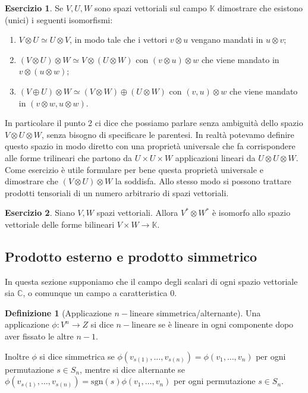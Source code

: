 \documentclass[11pt]{article}
\theoremstyle{plain}
\theoremstyle{definition}
\newtheorem{defn}{Definizione}[section]
\newtheorem{exercise}{Esercizio}[section]
\theoremstyle{remark}
\newcommand{\C}{\mathbb{C}}
\newcommand{\K}{\mathbb{K}}
\DeclareMathOperator{\iso}{\simeq}
\begin{document}
\begin{exercise}
Se $V,U,W$ sono spazi vettoriali sul campo $\K$ dimostrare che esistono (unici) i seguenti isomorfismi:
\begin{enumerate}
\item $V\otimes U \iso U\otimes V$, in modo tale che i vettori $v\otimes u$ vengano mandati in $u\otimes v$;
\item $(V\otimes U)\otimes W \iso V\otimes(U\otimes W)$ con $(v\otimes u)\otimes w$ che viene mandato in $v\otimes(u\otimes w)$;
\item $(V\oplus U)\otimes W \iso (V\otimes W) \oplus (U\otimes W)$ con $(v,u)\otimes w$ che viene mandato in $(v\otimes w, u\otimes w)$.
\end{enumerate}
\end{exercise}
In particolare il punto 2 ci dice che possiamo parlare senza ambiguità dello spazio $V\otimes U \otimes W$, senza bisogno di specificare le parentesi.
In realtà potevamo definire questo spazio in modo diretto con una proprietà universale che fa corrispondere alle forme trilineari che partono
da $U\times U\times W$ applicazioni lineari da $U\otimes U\otimes W$. Come esercizio è utile formulare per bene questa proprietà universale 
e dimostrare che $(V\otimes U)\otimes W$ la soddisfa. Allo stesso modo si possono trattare prodotti tensoriali di un numero arbitrario di spazi vettoriali.
\begin{exercise}
Siano $V,W$ spazi vettoriali. Allora $V^*\otimes W^*$ è isomorfo allo spazio vettoriale delle forme bilineari $V\times W\to \K$.
\end{exercise}


\subsection{Prodotto esterno e prodotto simmetrico}
In questa sezione supponiamo che il campo degli scalari di ogni spazio vettoriale sia $\C$, o comunque un campo a caratteristica $0$.


\begin{defn}[Applicazione $n-$lineare simmetrica/alternante]
 Una applicazione $\phi: V^n \to Z$ si dice $n-$lineare se è lineare in ogni componente dopo aver fissato le altre $n-1$.

 Inoltre $\phi$ si dice simmetrica se $\phi(v_{s(1)},\ldots,v_{s(n)})=\phi(v_1,\ldots,v_n)$ per ogni permutazione $s \in S_n$, mentre si dice
 alternante se $\phi(v_{s(1)},\ldots,v_{s(n)})=\mathrm{sgn}(s)\phi(v_1,\ldots,v_n)$ per ogni permutazione $s \in S_n$.
\end{defn}
\end{document}
